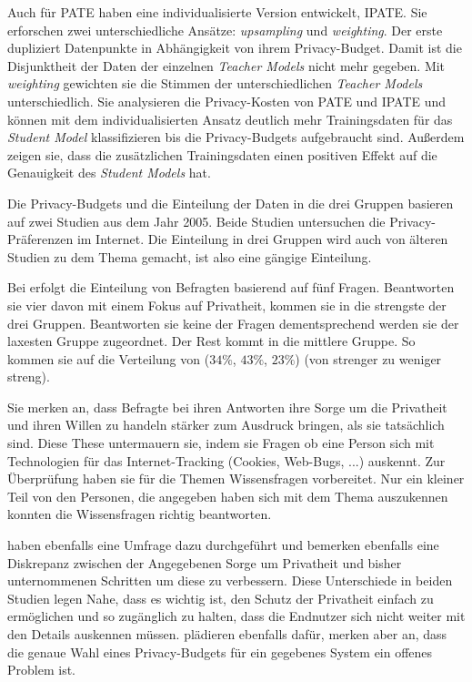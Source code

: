 Auch für PATE haben \textcite{boenisch:2023b} eine individualisierte Version entwickelt, IPATE. Sie erforschen zwei unterschiedliche Ansätze: \textit{upsampling} und \textit{weighting}. Der erste dupliziert Datenpunkte in Abhängigkeit von ihrem Privacy-Budget. Damit ist die Disjunktheit der Daten der einzelnen \textit{Teacher Models} nicht mehr gegeben. Mit \textit{weighting} gewichten sie die Stimmen der unterschiedlichen \textit{Teacher Models} unterschiedlich. Sie analysieren die Privacy-Kosten von PATE und IPATE und können mit dem individualisierten Ansatz deutlich mehr Trainingsdaten für das \textit{Student Model} klassifizieren bis die Privacy-Budgets aufgebraucht sind. Außerdem zeigen sie, dass die zusätzlichen Trainingsdaten einen positiven Effekt auf die Genauigkeit des \textit{Student Models} hat.

Die Privacy-Budgets und die Einteilung der Daten in die drei Gruppen basieren auf zwei Studien aus dem Jahr 2005\cite{jensen:2005, acquisti:2005}. Beide Studien untersuchen die Privacy-Präferenzen im Internet. Die Einteilung in drei Gruppen wird auch von älteren Studien zu dem Thema gemacht, ist also eine gängige Einteilung\cite{westin:1998}.

Bei \textcite{jensen:2005} erfolgt die Einteilung von Befragten basierend auf fünf Fragen. Beantworten sie vier davon mit einem Fokus auf Privatheit, kommen sie in die strengste der drei Gruppen. Beantworten sie keine der Fragen dementsprechend werden sie der laxesten Gruppe zugeordnet. Der Rest kommt in die mittlere Gruppe. So kommen sie auf die Verteilung von ($34\%$, $43\%$, $23\%$) (von strenger zu weniger streng). 

Sie merken an, dass Befragte bei ihren Antworten ihre Sorge um die Privatheit und ihren Willen zu handeln stärker zum Ausdruck bringen, als sie tatsächlich sind. Diese These untermauern sie, indem sie Fragen ob eine Person sich mit Technologien für das Internet-Tracking (Cookies, Web-Bugs, ...) auskennt. Zur Überprüfung haben sie für die Themen Wissensfragen vorbereitet. Nur ein kleiner Teil von den Personen, die angegeben haben sich mit dem Thema auszukennen konnten die Wissensfragen richtig beantworten.

\textcite{acquisti:2005} haben ebenfalls eine Umfrage dazu durchgeführt und bemerken ebenfalls eine Diskrepanz zwischen der Angegebenen Sorge um Privatheit und bisher unternommenen Schritten um diese zu verbessern. Diese Unterschiede in beiden Studien legen Nahe, dass es wichtig ist, den Schutz der Privatheit einfach zu ermöglichen und so zugänglich zu halten, dass die Endnutzer sich nicht weiter mit den Details auskennen müssen. \textcite{jorgensen:2015} plädieren ebenfalls dafür, merken aber an, dass die genaue Wahl eines Privacy-Budgets für ein gegebenes System ein offenes Problem ist.

